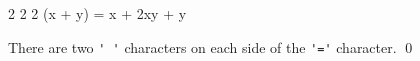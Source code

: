 \begin{console}
       2      2          2
(x + y)   =  x  + 2xy + y
\end{console}
There are two \verb!' '! characters on each side of the 
\verb!'='! character.
\qed

